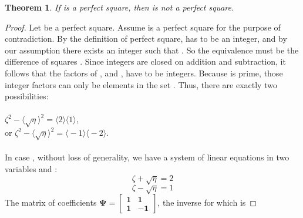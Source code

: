 \documentclass[preview]{standalone}
\newtheorem{theorem}{Theorem}
\begin{document}
\begin{theorem} %
    If \bm{$\eta$} is a perfect square, 
    then  is not a perfect square.
\end{theorem}

\begin{proof}
    Let \bm{$\eta$} be a perfect square. 
    Assume  is a perfect square for the purpose of contradiction. 
    By the definition of perfect square, 
    \bm{$\sqrt{\eta}$} has to be an integer, 
    and by our assumption there exists an integer \bm{$\zeta$} such that 
    . 
    So the equivalence 
     must be the difference of squares 
    . 
    Since integers are closed on addition and subtraction, 
    it follows that the factors of , 
    \bm{$\big \langle \zeta + \sqrt{\eta} \big \rangle$} and 
    \bm{$\big \langle \zeta - \sqrt{\eta} \big \rangle$}, 
    have to be integers. 
    Because  is prime, those integer factors can only be elements in the set
    . Thus, there are exactly two possibilities:
    \\ \\ \indent \indent {} $\zeta ^2 - \big \langle \sqrt{\eta} \big \rangle ^2 = 
                            \big \langle 2 \big \rangle \big \langle 1 \big \rangle$,
    \\ \indent \indent or  $\zeta ^2 - \big \langle \sqrt{\eta} \big \rangle ^2 = 
                            \big \langle -1 \big \rangle \big \langle -2 \big \rangle.$
    \\ \\ In case , without loss of generality, 
    we have a system of linear equations in two variables \bm{$\zeta$} and \bm{$\sqrt{\eta}$}:
    \begin{equation*}
        \zeta + \sqrt{\eta} = 2
    \end{equation*}
    \begin{equation*}
        \zeta - \sqrt{\eta} = 1
    \end{equation*}
    The matrix of coefficients 
    $\bm{\Psi =} \left[\begin{smallmatrix}
        \bm{1} & \bm{1} \\
        \bm{1} & \bm{-1} 
    \end{smallmatrix}\right]$, 
    the inverse for which is

\end{proof}
\end{document}
